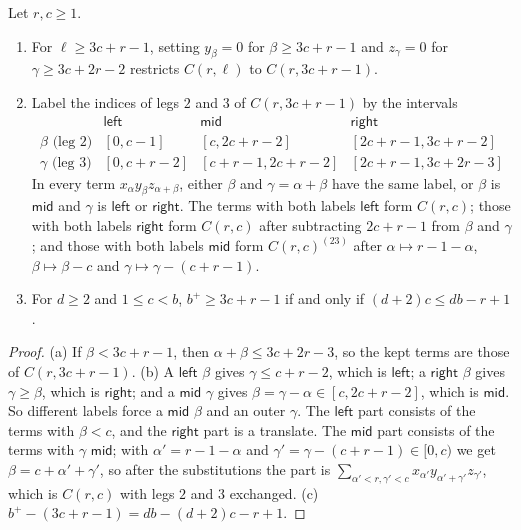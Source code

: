 \begin{lemma}\label{lem:reset}
Let \(r,c\ge1\).
\begin{enumerate}
\item[(a)] For \(\ell\ge3c+r-1\), setting \(y_\beta=0\) for
\(\beta\ge3c+r-1\) and \(z_\gamma=0\) for \(\gamma\ge3c+2r-2\) restricts
\(C(r,\ell)\) to \(C(r,3c+r-1)\).
\item[(b)] Label the indices of legs \(2\) and \(3\) of \(C(r,3c+r-1)\)
by the intervals
\[
\begin{array}{c|ccc}
 &\mathsf{left}&\mathsf{mid}&\mathsf{right}\\ \hline
 \beta\text{ (leg 2)}&[0,c-1]&[c,2c+r-2]&[2c+r-1,3c+r-2]\\
 \gamma\text{ (leg 3)}&[0,c+r-2]&[c+r-1,2c+r-2]&[2c+r-1,3c+2r-3]
\end{array}
\]
In every term \(x_\alpha y_\beta z_{\alpha+\beta}\), either \(\beta\) and
\(\gamma=\alpha+\beta\) have the same label, or \(\beta\) is
\(\mathsf{mid}\) and \(\gamma\) is \(\mathsf{left}\) or \(\mathsf{right}\).
The terms with both labels \(\mathsf{left}\) form \(C(r,c)\); those with
both labels \(\mathsf{right}\) form \(C(r,c)\) after subtracting
\(2c+r-1\) from \(\beta\) and \(\gamma\); and those with both labels
\(\mathsf{mid}\) form \(C(r,c)^{(23)}\) after \(\alpha\mapsto r-1-\alpha\),
\(\beta\mapsto\beta-c\) and \(\gamma\mapsto\gamma-(c+r-1)\).
\item[(c)] For \(d\ge2\) and \(1\le c<b\), \(b^+\ge3c+r-1\) if and only if
\((d+2)c\le db-r+1\).
\end{enumerate}
\end{lemma}

\begin{proof}
(a) If \(\beta<3c+r-1\), then \(\alpha+\beta\le3c+2r-3\), so the kept
terms are those of \(C(r,3c+r-1)\).
(b) A \(\mathsf{left}\) \(\beta\) gives \(\gamma\le c+r-2\), which is
\(\mathsf{left}\); a \(\mathsf{right}\) \(\beta\) gives
\(\gamma\ge\beta\), which is \(\mathsf{right}\); and a \(\mathsf{mid}\)
\(\gamma\) gives \(\beta=\gamma-\alpha\in[c,2c+r-2]\), which is
\(\mathsf{mid}\). So different labels force a \(\mathsf{mid}\) \(\beta\)
and an outer \(\gamma\). The \(\mathsf{left}\) part consists of the terms
with \(\beta<c\), and the \(\mathsf{right}\) part is a translate. The
\(\mathsf{mid}\) part consists of the terms with \(\gamma\) \(\mathsf{mid}\);
with \(\alpha'=r-1-\alpha\) and \(\gamma'=\gamma-(c+r-1)\in[0,c)\) we get
\(\beta=c+\alpha'+\gamma'\), so after the substitutions the part is
\(\sum_{\alpha'<r,\gamma'<c}x_{\alpha'}y_{\alpha'+\gamma'}z_{\gamma'}\),
which is \(C(r,c)\) with legs \(2\) and \(3\) exchanged.
(c) \(b^+-(3c+r-1)=db-(d+2)c-r+1\).
\end{proof}

